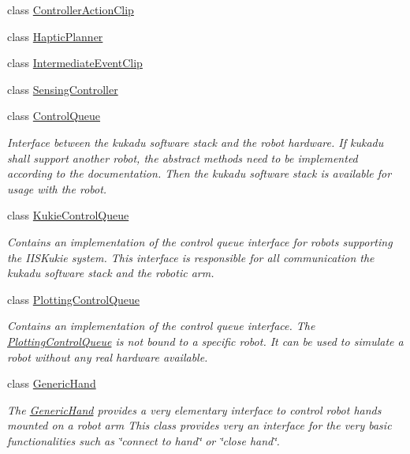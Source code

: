 \begin{DoxyCompactItemize}
class \hyperlink{classkukadu_1_1ControllerActionClip}{Controller\-Action\-Clip}
\item 
class \hyperlink{classkukadu_1_1HapticPlanner}{Haptic\-Planner}
\item 
class \hyperlink{classkukadu_1_1IntermediateEventClip}{Intermediate\-Event\-Clip}
\item 
class \hyperlink{classkukadu_1_1SensingController}{Sensing\-Controller}
\item 
class \hyperlink{classkukadu_1_1ControlQueue}{Control\-Queue}
\begin{DoxyCompactList}\small\item\em Interface between the kukadu software stack and the robot hardware. If kukadu shall support another robot, the abstract methods need to be implemented according to the documentation. Then the kukadu software stack is available for usage with the robot. \end{DoxyCompactList}\item 
class \hyperlink{classkukadu_1_1KukieControlQueue}{Kukie\-Control\-Queue}
\begin{DoxyCompactList}\small\item\em Contains an implementation of the control queue interface for robots supporting the I\-I\-S\-Kukie system. This interface is responsible for all communication the kukadu software stack and the robotic arm. \end{DoxyCompactList}\item 
class \hyperlink{classkukadu_1_1PlottingControlQueue}{Plotting\-Control\-Queue}
\begin{DoxyCompactList}\small\item\em Contains an implementation of the control queue interface. The \hyperlink{classkukadu_1_1PlottingControlQueue}{Plotting\-Control\-Queue} is not bound to a specific robot. It can be used to simulate a robot without any real hardware available. \end{DoxyCompactList}\item 
class \hyperlink{classkukadu_1_1GenericHand}{Generic\-Hand}
\begin{DoxyCompactList}\small\item\em The \hyperlink{classkukadu_1_1GenericHand}{Generic\-Hand} provides a very elementary interface to control robot hands mounted on a robot arm This class provides very an interface for the very basic functionalities such as \char`\"{}connect to hand\char`\"{} or \char`\"{}close hand\char`\"{}. \end{DoxyCompactList}\item 

\end{DoxyCompactItemize}
